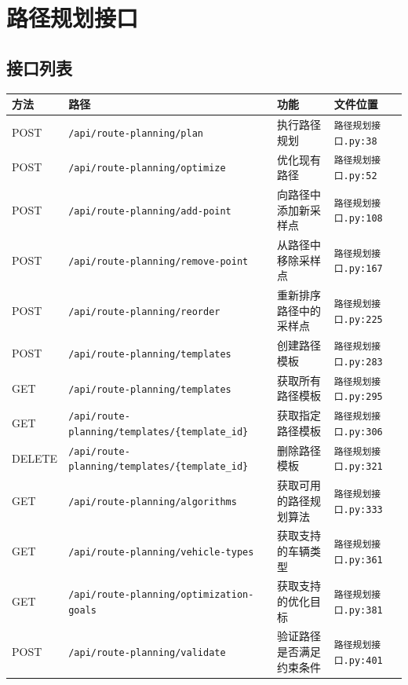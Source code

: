 \documentclass[12pt,a4paper,openany]{report}
\begin{document}
\section{路径规划接口}

\subsection{接口列表}

\begin{longtable}{|l|l|l|l|}
\hline
\textbf{方法} & \textbf{路径} & \textbf{功能} & \textbf{文件位置} \\
\hline
\endhead
POST & \texttt{/api/route-planning/plan} & 执行路径规划 & \texttt{路径规划接口.py:38} \\
POST & \texttt{/api/route-planning/optimize} & 优化现有路径 & \texttt{路径规划接口.py:52} \\
POST & \texttt{/api/route-planning/add-point} & 向路径中添加新采样点 & \texttt{路径规划接口.py:108} \\
POST & \texttt{/api/route-planning/remove-point} & 从路径中移除采样点 & \texttt{路径规划接口.py:167} \\
POST & \texttt{/api/route-planning/reorder} & 重新排序路径中的采样点 & \texttt{路径规划接口.py:225} \\
POST & \texttt{/api/route-planning/templates} & 创建路径模板 & \texttt{路径规划接口.py:283} \\
GET & \texttt{/api/route-planning/templates} & 获取所有路径模板 & \texttt{路径规划接口.py:295} \\
GET & \texttt{/api/route-planning/templates/\{template\_id\}} & 获取指定路径模板 & \texttt{路径规划接口.py:306} \\
DELETE & \texttt{/api/route-planning/templates/\{template\_id\}} & 删除路径模板 & \texttt{路径规划接口.py:321} \\
GET & \texttt{/api/route-planning/algorithms} & 获取可用的路径规划算法 & \texttt{路径规划接口.py:333} \\
GET & \texttt{/api/route-planning/vehicle-types} & 获取支持的车辆类型 & \texttt{路径规划接口.py:361} \\
GET & \texttt{/api/route-planning/optimization-goals} & 获取支持的优化目标 & \texttt{路径规划接口.py:381} \\
POST & \texttt{/api/route-planning/validate} & 验证路径是否满足约束条件 & \texttt{路径规划接口.py:401} \\
\hline
\end{longtable}
\end{document}
